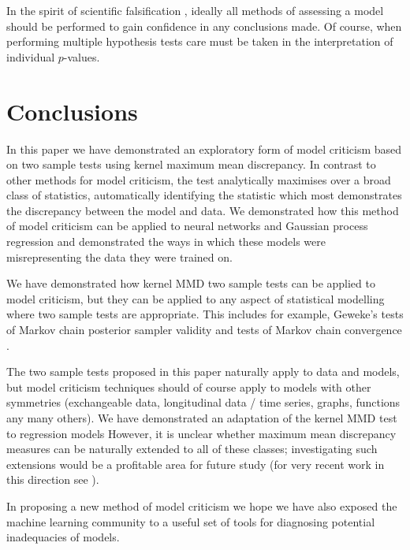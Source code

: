 In the spirit of scientific falsification \citep[e.g.][]{Popper2005-qq}, ideally all methods of assessing a model should be performed to gain confidence in any conclusions made.
Of course, when performing multiple hypothesis tests care must be taken in the interpretation of individual $p$-values.

\section{Conclusions}

In this paper we have demonstrated an exploratory form of model criticism based on two sample tests using kernel maximum mean discrepancy.
In contrast to other methods for model criticism, the test analytically maximises over a broad class of statistics, automatically identifying the statistic which most demonstrates the discrepancy between the model and data.
We demonstrated how this method of model criticism can be applied to neural networks and Gaussian process regression and demonstrated the ways in which these models were misrepresenting the data they were trained on.

We have demonstrated how kernel MMD two sample tests can be applied to model criticism, but they can be applied to any aspect of statistical modelling where two sample tests are appropriate.
This includes for example, Geweke's tests of Markov chain posterior sampler validity \citep{Geweke2004-yx} and tests of Markov chain convergence \citep[e.g.][]{Cowles1996-qy}.

The two sample tests proposed in this paper naturally apply to \iid data and models, but model criticism techniques should of course apply to models with other symmetries (\eg exchangeable data, longitudinal data / time series, graphs, functions any many others).
We have demonstrated an adaptation of the kernel MMD test to regression models
However, it is unclear whether maximum mean discrepancy measures can be naturally extended to all of these classes; investigating such extensions would be a profitable area for future study (for very recent work in this direction see \cite{Chwialkowski2014-pe}).

In proposing a new method of model criticism we hope we have also exposed the machine learning community to a useful set of tools for diagnosing potential inadequacies of models.


